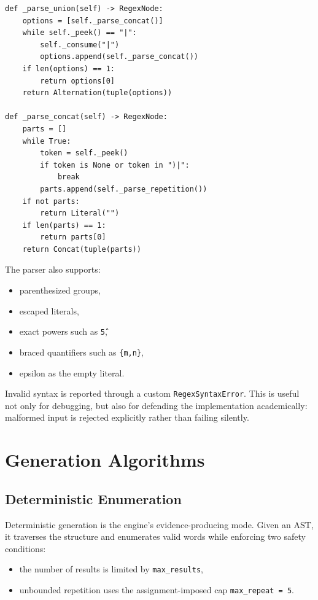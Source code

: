 \documentclass[a4paper,12pt]{article}
\begin{document}
\begin{lstlisting}[style=labpython,caption={Representative recursive-descent parsing logic for alternation and concatenation.}]
def _parse_union(self) -> RegexNode:
    options = [self._parse_concat()]
    while self._peek() == "|":
        self._consume("|")
        options.append(self._parse_concat())
    if len(options) == 1:
        return options[0]
    return Alternation(tuple(options))

def _parse_concat(self) -> RegexNode:
    parts = []
    while True:
        token = self._peek()
        if token is None or token in ")|":
            break
        parts.append(self._parse_repetition())
    if not parts:
        return Literal("")
    if len(parts) == 1:
        return parts[0]
    return Concat(tuple(parts))
\end{lstlisting}

The parser also supports:

\begin{itemize}
    \item parenthesized groups,
    \item escaped literals,
    \item exact powers such as \texttt{\^5},
    \item braced quantifiers such as \texttt{\{m,n\}},
    \item epsilon as the empty literal.
\end{itemize}

Invalid syntax is reported through a custom \texttt{RegexSyntaxError}. This is useful not only for debugging, but also for defending the implementation academically: malformed input is rejected explicitly rather than failing silently.

\section{Generation Algorithms}

\subsection{Deterministic Enumeration}

Deterministic generation is the engine's evidence-producing mode. Given an AST, it traverses the structure and enumerates valid words while enforcing two safety conditions:

\begin{itemize}
    \item the number of results is limited by \texttt{max\_results},
    \item unbounded repetition uses the assignment-imposed cap \texttt{max\_repeat = 5}.
\end{itemize}
\end{document}
